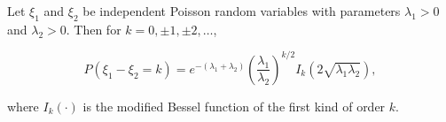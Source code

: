 Let $\xi_1$ and $\xi_2$ be independent Poisson random variables with parameters $\lambda_1 > 0$ and $\lambda_2 > 0$. Then for $k = 0, \pm 1, \pm 2, \ldots$,

$$P(\xi_1 - \xi_2 = k) = e^{-(\lambda_1 + \lambda_2)} \left(\frac{\lambda_1}{\lambda_2}\right)^{k/2} I_k\!\left(2\sqrt{\lambda_1 \lambda_2}\right),$$

where $I_k(\cdot)$ is the modified Bessel function of the first kind of order $k$.
